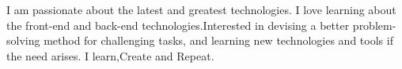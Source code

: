 

\begin{cvparagraph}

I am passionate about the latest and greatest technologies. I love learning about the front-end and back-end technologies.Interested in devising a better problem-solving method for challenging tasks, and learning new technologies and tools if the need arises.
I learn,Create and Repeat.

\end{cvparagraph}
